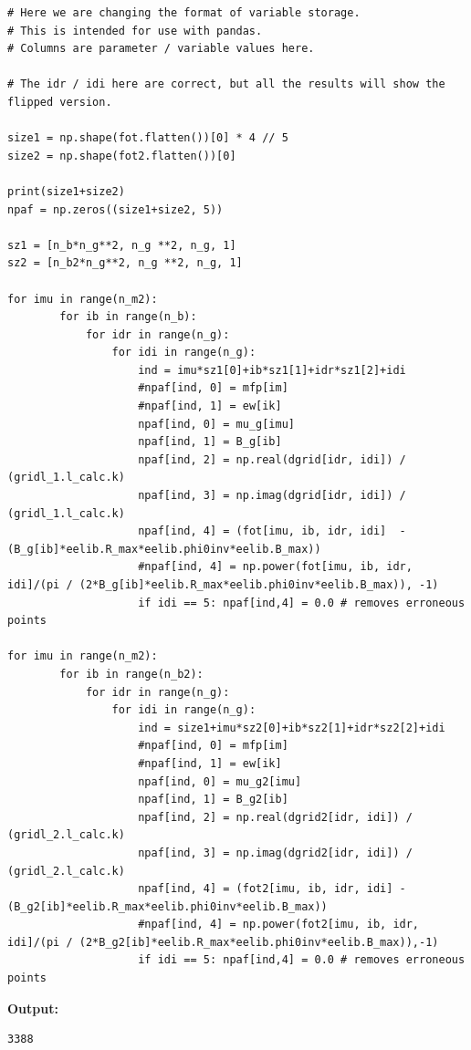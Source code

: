 \documentclass{article}
\begin{document}
\begin{lstlisting}
# Here we are changing the format of variable storage.
# This is intended for use with pandas.
# Columns are parameter / variable values here.

# The idr / idi here are correct, but all the results will show the flipped version.

size1 = np.shape(fot.flatten())[0] * 4 // 5
size2 = np.shape(fot2.flatten())[0]

print(size1+size2)
npaf = np.zeros((size1+size2, 5))

sz1 = [n_b*n_g**2, n_g **2, n_g, 1]
sz2 = [n_b2*n_g**2, n_g **2, n_g, 1]

for imu in range(n_m2):
        for ib in range(n_b):
            for idr in range(n_g):
                for idi in range(n_g):
                    ind = imu*sz1[0]+ib*sz1[1]+idr*sz1[2]+idi
                    #npaf[ind, 0] = mfp[im]
                    #npaf[ind, 1] = ew[ik]
                    npaf[ind, 0] = mu_g[imu]
                    npaf[ind, 1] = B_g[ib]
                    npaf[ind, 2] = np.real(dgrid[idr, idi]) / (gridl_1.l_calc.k)
                    npaf[ind, 3] = np.imag(dgrid[idr, idi]) / (gridl_1.l_calc.k)
                    npaf[ind, 4] = (fot[imu, ib, idr, idi]  - (B_g[ib]*eelib.R_max*eelib.phi0inv*eelib.B_max))
                    #npaf[ind, 4] = np.power(fot[imu, ib, idr, idi]/(pi / (2*B_g[ib]*eelib.R_max*eelib.phi0inv*eelib.B_max)), -1)
                    if idi == 5: npaf[ind,4] = 0.0 # removes erroneous points

for imu in range(n_m2):
        for ib in range(n_b2):
            for idr in range(n_g):
                for idi in range(n_g):
                    ind = size1+imu*sz2[0]+ib*sz2[1]+idr*sz2[2]+idi
                    #npaf[ind, 0] = mfp[im]
                    #npaf[ind, 1] = ew[ik]
                    npaf[ind, 0] = mu_g2[imu]
                    npaf[ind, 1] = B_g2[ib]
                    npaf[ind, 2] = np.real(dgrid2[idr, idi]) / (gridl_2.l_calc.k)
                    npaf[ind, 3] = np.imag(dgrid2[idr, idi]) / (gridl_2.l_calc.k)
                    npaf[ind, 4] = (fot2[imu, ib, idr, idi] - (B_g2[ib]*eelib.R_max*eelib.phi0inv*eelib.B_max))
                    #npaf[ind, 4] = np.power(fot2[imu, ib, idr, idi]/(pi / (2*B_g2[ib]*eelib.R_max*eelib.phi0inv*eelib.B_max)),-1)
                    if idi == 5: npaf[ind,4] = 0.0 # removes erroneous points\end{lstlisting}

\textbf{Output:}\begin{verbatim}
3388

\end{verbatim}
\end{document}
